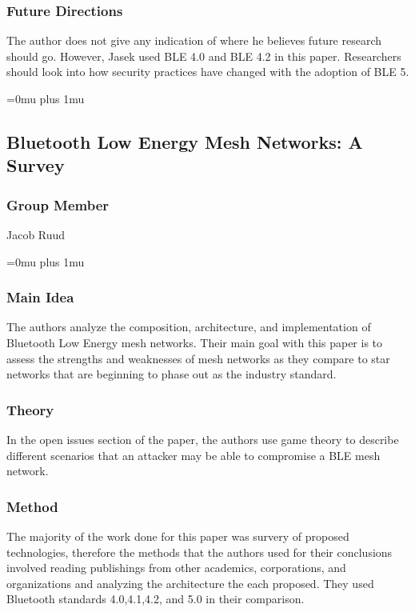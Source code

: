 \subsubsection{Future Directions}
The author does not give any indication of where he believes future research should go. However, Jasek used BLE 4.0 and BLE 4.2 in this paper. Researchers should look into how security practices have changed with the adoption of BLE 5. 
\noindent


\Urlmuskip=0mu plus 1mu\relax

\subsection{Bluetooth Low Energy Mesh Networks: A Survey}

\subsubsection{Group Member}

\noindent
Jacob Ruud

\Urlmuskip=0mu plus 1mu\relax
{}

\subsubsection{Main Idea}

\noindent
The authors analyze the composition, architecture, and implementation of Bluetooth Low Energy mesh networks. Their main goal with this paper is to assess the strengths and weaknesses of mesh networks as they compare to star networks that are beginning to phase out as the industry standard.

\subsubsection{Theory}

\noindent

In the open issues section of the paper, the authors use game theory to describe different scenarios that an attacker may be able to compromise a BLE mesh network.

\subsubsection{Method}

\noindent
The majority of the work done for this paper was survery of proposed technologies, therefore the methods that the authors used for their conclusions involved reading publishings from other academics, corporations, and organizations and analyzing the architecture the each proposed. They used Bluetooth standards 4.0,4.1,4.2, and 5.0 in their comparison.

